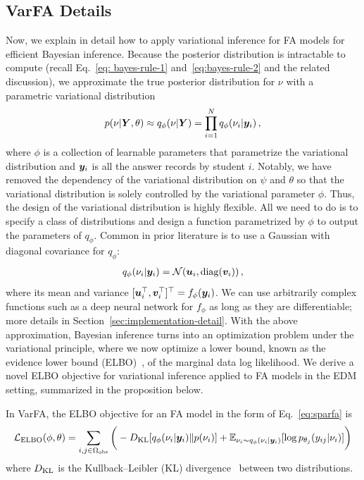 \subsection{VarFA Details}
\label{sec:method-details}
Now, we explain in detail how to apply variational inference for FA models for efficient Bayesian inference.
Because the posterior distribution is intractable to compute (recall Eq.~\ref{eq: bayes-rule-1} and~\ref{eq:bayes-rule-2} and the related discussion), we approximate the true posterior distribution for $\nu$ with a parametric variational distribution
\begin{align}
    p(\nu | {\bm{Y}}, \theta) \approx q_{\phi}(\nu | {\bm{Y}}) = \prod_{i=1}^N q_{\phi}(\nu_i | {\bm{y}}_i)  \,,
\end{align}
where $\phi$ is a collection of learnable parameters that parametrize the variational distribution and ${\bm{y}}_i$ is all the answer records by student $i$. Notably, we have removed the dependency of the variational distribution on $\psi$ and $\theta$ so that the variational distribution is solely controlled by the variational parameter $\phi$. Thus, the design of the variational distribution is highly flexible. All we need to do is to specify a class of distributions and design a function parametrized by $\phi$ to output the parameters of $q_\phi$.
Common in prior literature is to use a Gaussian with diagonal covariance for $q_\phi$:
\begin{align}
    q_\phi(\nu_i | {\bm{y}}_i) = \mathcal{N}({\bm{u}}_i, {\rm diag}({\bm{v}}_i))\,,\label{eq:variational-distribution}
\end{align}
%
where its mean and variance $[{\bm{u}}_i^\top, {\bm{v}}_i^\top]^\top = f_\phi({\bm{y}}_i)$. We
can use arbitrarily complex functions such as a deep neural network for
$f_\phi$ as long as they are differentiable; more details in
Section~\ref{sec:implementation-detail}. With the above approximation, Bayesian
inference turns into an optimization problem under the variational principle,
where we now optimize a lower bound, known as the evidence lower bound
(ELBO)~\cite{bishop2006pattern}, of the marginal data log likelihood. We derive
a novel ELBO objective for variational inference applied to FA models in the
EDM setting, summarized in the proposition below.
\begin{prop} In VarFA, the ELBO objective for an FA model in the form of Eq.~\ref{eq:sparfa} is
    \begin{align} \label{eq:elbo}
        \mathcal{L}_{\rm ELBO}(\phi, \theta) = \sum_{i,j\in\Omega_{\rm obs}} \bigg(-D_{\rm KL}[q_\phi(\nu_i|{\bm{y}}_i)\|p(\nu_i)] + \mathbb{E}_{\nu_i\sim q_\phi(\nu_i|{\bm{y}}_i)}[{\rm log}\,p_{\theta_j}(y_{ij}|\nu_i)]\bigg)
    \end{align}
    where $D_{\rm KL}$ is the Kullback–Leibler (KL) divergence~\cite{mackay2003information} between two distributions.
\end{prop}
